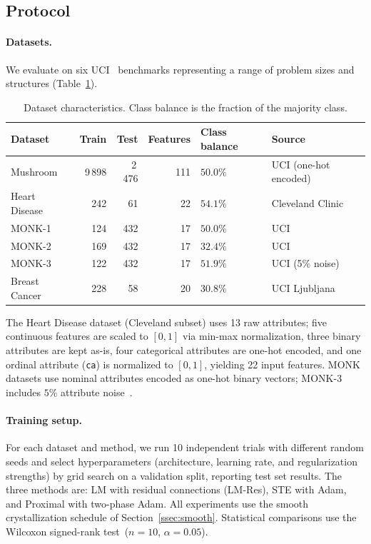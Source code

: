\documentclass[12pt,a4paper]{article}
\begin{document}
\subsection{Protocol}
\label{ssec:protocol}

\paragraph{Datasets.}
We evaluate on six UCI~\cite{uci2017} benchmarks representing a range of
problem sizes and structures (Table~\ref{tab:datasets}).

\begin{table}[h]
\centering
\caption{Dataset characteristics. Class balance is the fraction of the majority class.}
\label{tab:datasets}
\setlength{\tabcolsep}{5pt}
\begin{tabular}{lrrrll}
\toprule
Dataset & Train & Test & Features & Class balance & Source \\
\midrule
Mushroom       & 9\,898  & 2\,476 & 111 & $50.0\%$ & UCI (one-hot encoded) \\
Heart Disease  & 242     & 61     & 22  & $54.1\%$ & Cleveland Clinic~\cite{detrano1989} \\
MONK-1         & 124     & 432    & 17  & $50.0\%$ & UCI~\cite{thrun1991} \\
MONK-2         & 169     & 432    & 17  & $32.4\%$ & UCI~\cite{thrun1991} \\
MONK-3         & 122     & 432    & 17  & $51.9\%$ & UCI (5\% noise) \\
Breast Cancer  & 228     & 58     & 20  & $30.8\%$ & UCI Ljubljana \\
\bottomrule
\end{tabular}
\end{table}

The Heart Disease dataset (Cleveland subset) uses 13 raw attributes;
five continuous features are scaled to $[0,1]$ via min-max normalization,
three binary attributes are kept as-is, four categorical attributes are
one-hot encoded, and one ordinal attribute (\texttt{ca}) is normalized to
$[0,1]$, yielding 22 input features.
MONK datasets use nominal attributes encoded as one-hot binary vectors;
MONK-3 includes $5\%$ attribute noise~\cite{thrun1991}.

\paragraph{Training setup.}
For each dataset and method, we run 10 independent trials with different
random seeds and select hyperparameters (architecture, learning rate, and
regularization strengths) by grid search on a validation split, reporting
test set results.
The three methods are:
LM with residual connections (LM-Res), STE with Adam, and Proximal with
two-phase Adam.
All experiments use the smooth crystallization schedule of
Section~\ref{ssec:smooth}.
Statistical comparisons use the Wilcoxon signed-rank test~($n = 10$, $\alpha = 0.05$).
\end{document}
